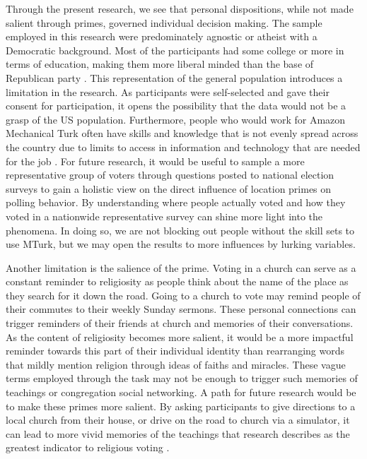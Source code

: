 \documentclass[letterpaper,man,natbib,noextraspace,12pt]{apa6}  %
\begin{document}
Through the present research, we see that personal dispositions, while not made salient through primes, governed individual decision making. The sample employed in this research were predominately agnostic or atheist with a Democratic background. Most of the participants had some college or more in terms of education, making them more liberal minded than the base of Republican party \citep{gelman_red_2010}. This representation of the general population introduces a limitation in the research. As participants were self-selected and gave their consent for participation, it opens the possibility that the data would not be a grasp of the US population. Furthermore, people who would work for Amazon Mechanical Turk often have skills and knowledge that is not evenly spread across the country due to limits to access in information and technology that are needed for the job \citep{hochschild2018strangers}. For future research, it would be useful to sample a more representative group of voters through questions posted to national election surveys to gain a holistic view on the direct influence of location primes on polling behavior. By understanding where people actually voted and how they voted in a nationwide representative survey can shine more light into the phenomena. In doing so, we are not blocking out people without the skill sets to use MTurk, but we may open the results to more influences by lurking variables. 

Another limitation is the salience of the prime. Voting in a church can serve as a constant reminder to religiosity as people think about the name of the place as they search for it down the road. Going to a church to vote may remind people of their commutes to their weekly Sunday sermons. These personal connections can trigger reminders of their friends at church and memories of their conversations. As the content of religiosity becomes more salient, it would be a more impactful reminder towards this part of their individual identity than rearranging words that mildly mention religion through ideas of faiths and miracles. These vague terms employed through the task may not be enough to trigger such memories of teachings or congregation social networking. A path for future research would be to make these primes more salient. By asking participants to give directions to a local church from their house, or drive on the road to church via a simulator, it can lead to more vivid memories of the teachings that research describes as the greatest indicator to religious voting \citep{putnam_american_2010}.
\end{document}

